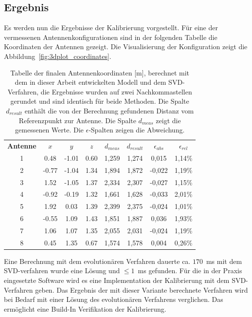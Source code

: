 \subsection{Ergebnis}
Es werden nun die Ergebnisse der Kalibrierung vorgestellt. Für eine der vermessenen Antennenkonfigurationen sind in der folgenden Tabelle die Koordinaten der Antennen gezeigt. Die Visualisierung der Konfiguration zeigt die Abbildung~\ref{fig:3dplot_coordinates}.
%
\begin{table} [ht!]
	\begin{center}
		\begin{tabular}{cccccccc}
		      \textbf{Antenne} & \textbf{$x$} & \textbf{$y$} & \textbf{$z$} & \textbf{$d_{meas}$} & \textbf{$d_{result}$}& \textbf{$\epsilon_{abs}$} & \textbf{$\epsilon_{rel}$} \\
		      1 & 0.48		& -1.01	& 0.60 & 1,259 & 1,274& 0,015 & 1,14\% \\
		      2 & -0.77 	& -1.04 	& 1.34 & 1,894 & 1,872 & -0,022 & 1,19\% \\
		      3 & 1.52  	& -1.05 	& 1.37 & 2,334 & 2,307 & -0,027 & 1,15\% \\
		      4 & -0.92 	& -0.19 	& 1.32 & 1,661 & 1,628 & -0,033 & 2,01\% \\
		      5 & 1.92 		&  0.03 	& 1.39 & 2,399 & 2,375 & -0,024 & 1,01\% \\
		      6 & -0.55 	&  1.09 	& 1.43 & 1,851 & 1,887 & 0,036 & 1,93\% \\
		      7 & 1.06 		&  1.07 	& 1.35 & 2,055 & 2,031 & -0,024 & 1,19\% \\
		      8 & 0.45 		&  1.35 	& 0.67 & 1,574 & 1,578 & 0,004 & 0,26\% \\					
%
		\end{tabular}
		\caption[Finale Antennen Koordinaten]{Tabelle der finalen Antennenkoordinaten [m], berechnet mit dem in dieser Arbeit entwickelten Modell und dem SVD-Verfahren, die Ergebnisse wurden auf zwei Nachkommastellen gerundet und sind identisch für beide Methoden. Die Spalte $d_{result}$ enthält die von der Berechnung gefundenen Distanz vom Referenzpunkt zur Antenne. Die Spalte $d_{meas}$ zeigt die gemessenen Werte. Die $\epsilon$-Spalten zeigen die Abweichung.}
		\label{tab:FinalCoords}
	\end{center}
\end{table}
%
Eine Berechnung mit dem evolutionären Verfahren dauerte ca. $170$~ms mit dem SVD-verfahren wurde eine Lösung und $\le 1$~ms gefunden. Für die in der Praxis eingesetzte Software wird es eine Implementation der Kalibrierung mit dem SVD-Verfahren geben. Das Ergebnis der mit dieser Variante berechnete Verfahren wird bei Bedarf mit einer Lösung des evolutionären Verfahrens verglichen. Das ermöglicht eine Build-In Verifikation der Kalibrierung.\\


